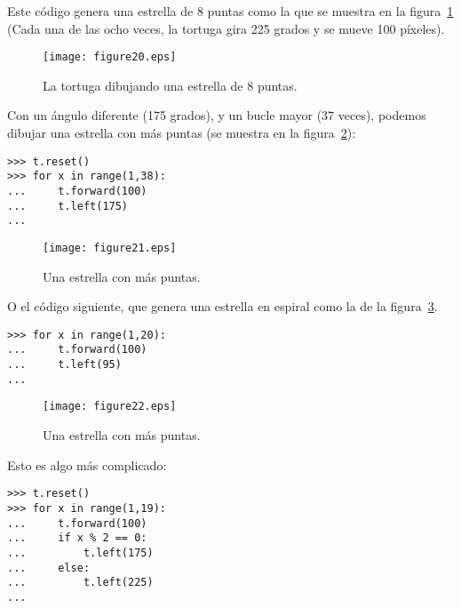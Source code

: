 Este código genera una estrella de 8 puntas como la que se muestra en la figura~\ref{fig20} (Cada una de las ocho veces, la tortuga gira 225 grados y se mueve 100 píxeles).

\begin{figure}
\begin{center}
\texttt{[image: figure20.eps]}
\end{center}
\caption{La tortuga dibujando una estrella de 8 puntas.}\label{fig20}
\end{figure}

\noindent
Con un ángulo diferente (175 grados), y un bucle mayor (37 veces), podemos dibujar una estrella con más puntas (se muestra en la figura~\ref{fig21}):

\begin{listing}
\begin{verbatim}
>>> t.reset()
>>> for x in range(1,38):
...     t.forward(100)
...     t.left(175)
...
\end{verbatim}
\end{listing}

\begin{figure}
\begin{center}
\texttt{[image: figure21.eps]}
\end{center}
\caption{Una estrella con más puntas.}\label{fig21}
\end{figure}

\noindent
O el código siguiente, que genera una estrella en espiral como la de la figura~\ref{fig22}.

\begin{listing}
\begin{verbatim}
>>> for x in range(1,20):
...     t.forward(100)
...     t.left(95)
...
\end{verbatim}
\end{listing}

\begin{figure}
\begin{center}
\texttt{[image: figure22.eps]}
\end{center}
\caption{Una estrella con más puntas.}\label{fig22}
\end{figure}

\noindent
Esto es algo más complicado:

\begin{listing}
\begin{verbatim}
>>> t.reset()
>>> for x in range(1,19):
...     t.forward(100)
...     if x % 2 == 0:
...         t.left(175)
...     else:
...         t.left(225)
...
\end{verbatim}
\end{listing}

